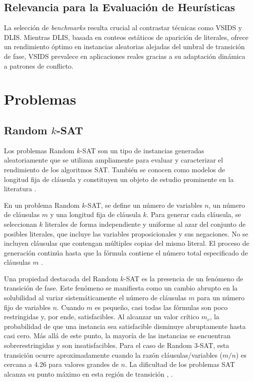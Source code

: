 \subsection{Relevancia para la Evaluación de Heurísticas}
La selección de \textit{benchmarks} resulta crucial al contrastar técnicas como VSIDS y DLIS. Mientras DLIS, basada en conteos estáticos de aparición de literales, ofrece un rendimiento óptimo en instancias aleatorias alejadas del umbral de transición de fase, VSIDS prevalece en aplicaciones reales gracias a su adaptación dinámica a patrones de conflicto.

\section{Problemas}
\label{sec:problemas-ej}

\subsection{Random $k$-SAT}
\label{subsec:random-k-sat}
Los problemas Random $k$-SAT son un tipo de instancias generadas aleatoriamente que se utilizan ampliamente para evaluar y caracterizar el rendimiento de los algoritmos SAT. También se conocen como modelos de longitud fija de cláusula y constituyen un objeto de estudio prominente en la literatura \cite{hoos1998sat}. %

En un problema Random $k$-SAT, se define un número de variables $n$, un número de cláusulas $m$ y una longitud fija de cláusula $k$. Para generar cada cláusula, se seleccionan $k$ literales de forma independiente y uniforme al azar del conjunto de posibles literales, que incluye las variables proposicionales y sus negaciones. No se incluyen cláusulas que contengan múltiples copias del mismo literal. El proceso de generación continúa hasta que la fórmula contiene el número total especificado de cláusulas $m$ \cite{hoos1998sat}. %

Una propiedad destacada del Random $k$-SAT es la presencia de un fenómeno de transición de fase. Este fenómeno se manifiesta como un cambio abrupto en la solubilidad al variar sistemáticamente el número de cláusulas $m$ para un número fijo de variables $n$. Cuando $m$ es pequeño, casi todas las fórmulas son poco restringidas y, por ende, satisfacibles. Al alcanzar un valor crítico $m_c$, la probabilidad de que una instancia sea satisfacible disminuye abruptamente hasta casi cero. Más allá de este punto, la mayoría de las instancias se encuentran sobre\-restringidas y son insatisfacibles. Para el caso de Random 3-SAT, esta transición ocurre aproximadamente cuando la razón cláusulas/variables ($m/n$) es cercana a 4.26 para valores grandes de $n$. La dificultad de los problemas SAT alcanza su punto máximo en esta región de transición \cite{hoos1998sat}, \cite{ganesh_unreasonable}. %

